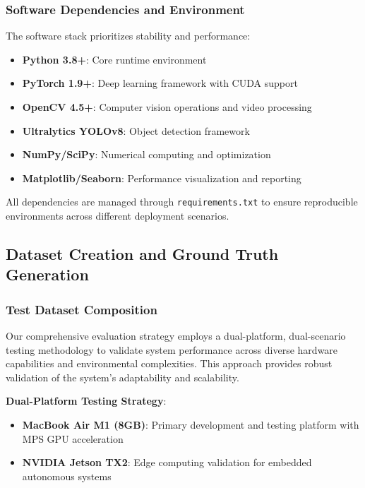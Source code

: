 \documentclass[12pt,oneside]{book}
\begin{document}
\subsubsection{Software Dependencies and Environment}

The software stack prioritizes stability and performance:

\begin{itemize}
\item \textbf{Python 3.8+}: Core runtime environment
\item \textbf{PyTorch 1.9+}: Deep learning framework with CUDA support
\item \textbf{OpenCV 4.5+}: Computer vision operations and video processing
\item \textbf{Ultralytics YOLOv8}: Object detection framework
\item \textbf{NumPy/SciPy}: Numerical computing and optimization
\item \textbf{Matplotlib/Seaborn}: Performance visualization and reporting
\end{itemize}

All dependencies are managed through \texttt{requirements.txt} to ensure reproducible environments across different deployment scenarios.

\subsection{Dataset Creation and Ground Truth Generation}

\subsubsection{Test Dataset Composition}

Our comprehensive evaluation strategy employs a dual-platform, dual-scenario testing methodology to validate system performance across diverse hardware capabilities and environmental complexities. This approach provides robust validation of the system's adaptability and scalability.

\textbf{Dual-Platform Testing Strategy}:
\begin{itemize}
\item \textbf{MacBook Air M1 (8GB)}: Primary development and testing platform with MPS GPU acceleration
\item \textbf{NVIDIA Jetson TX2}: Edge computing validation for embedded autonomous systems
\end{itemize}
\end{document}
